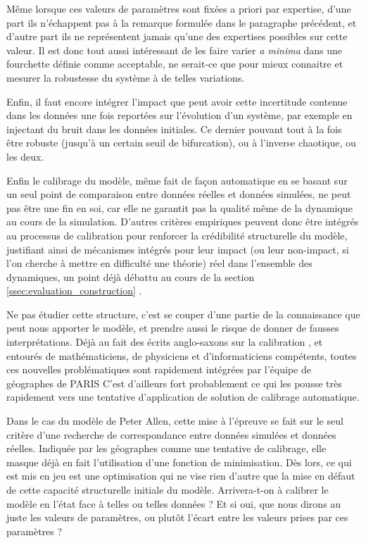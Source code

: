 Même lorsque ces valeurs de paramètres sont fixées a priori par expertise, d'une part ils n'échappent pas à la remarque formulée dans le paragraphe précédent, et d'autre part ils ne représentent jamais qu'une des expertises possibles sur cette valeur. Il est donc tout aussi intéressant de les faire varier \textit{a minima} dans une fourchette définie comme acceptable, ne serait-ce que pour mieux connaitre et mesurer la robustesse du système à de telles variations.

Enfin, il faut encore intégrer l'impact que peut avoir cette incertitude contenue dans les données une fois reportées sur l'évolution d'un système, par exemple en injectant du bruit dans les données initiales. Ce dernier pouvant tout à la fois être robuste (jusqu'à un certain seuil de bifurcation), ou à l'inverse chaotique, ou les deux.

Enfin le calibrage du modèle, même fait de façon automatique en se basant sur un seul point de comparaison entre données réelles et données simulées, ne peut pas être une fin en soi, car elle ne garantit pas la qualité même de la dynamique au cours de la simulation. D'autres critères empiriques peuvent donc être intégrés au processus de calibration pour renforcer la crédibilité structurelle du modèle, justifiant ainsi de mécanismes intégrés pour leur impact (ou leur non-impact, si l'on cherche à mettre en difficulté une théorie) réel dans l'ensemble des dynamiques, un point déjà débattu au cours de la section \ref{ssec:evaluation_construction} \autocites{Hermann1967, Grimm2005,Cottineau2014b}.

Ne pas étudier cette structure, c'est se couper d'une partie de la connaissance que peut nous apporter le modèle, et prendre aussi le risque de donner de fausses interprétations. Déjà au fait des écrits anglo-saxons sur la calibration \autocite{Batty1976}, et entourés de mathématiciens, de physiciens et d'informaticiens compétents, toutes ces nouvelles problématiques sont rapidement intégrées par l'équipe de géographes de PARIS \autocites{Sanders1984, Sanders1985, Pumain1989} C'est d'ailleurs fort probablement ce qui les pousse très rapidement vers une tentative d'application de solution de calibrage automatique.

Dans le cas du modèle de Peter Allen, cette mise à l'épreuve se fait sur le seul critère d'une recherche de correspondance entre données simulées et données réelles. Indiquée par les géographes comme une tentative de calibrage, elle masque déjà en fait l'utilisation d'une fonction de minimisation. Dès lors, ce qui est mis en jeu est une optimisation qui ne vise rien d'autre que la mise en défaut de cette capacité structurelle initiale du modèle. Arrivera-t-on à calibrer le modèle en l'état face à telles ou telles données ? Et si oui, que nous dirons au juste les valeurs de paramètres, ou plutôt l'écart entre les valeurs prises par ces paramètres ?

